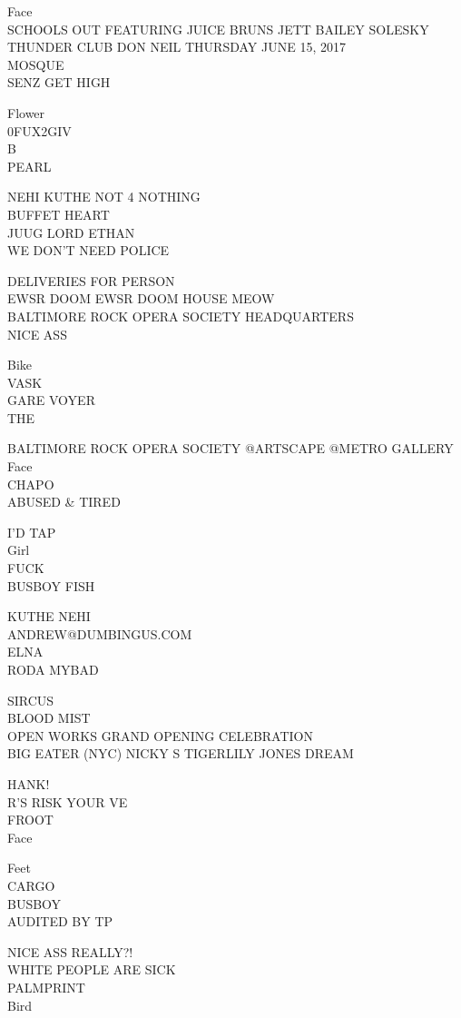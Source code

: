 \documentclass[10pt,letterpaper]{article}
\begin{document}
Face\\
SCHOOLS OUT FEATURING JUICE BRUNS JETT BAILEY SOLESKY THUNDER CLUB DON NEIL THURSDAY JUNE 15, 2017\\
MOSQUE\\
SENZ GET HIGH

Flower\\
0FUX2GIV\\
B\\
PEARL

NEHI KUTHE NOT 4 NOTHING\\
BUFFET HEART\\
JUUG LORD ETHAN\\
WE DON'T NEED POLICE

DELIVERIES FOR PERSON\\
EWSR DOOM EWSR DOOM HOUSE MEOW\\
BALTIMORE ROCK OPERA SOCIETY HEADQUARTERS\\
NICE ASS

Bike\\
VASK\\
GARE VOYER\\
THE

BALTIMORE ROCK OPERA SOCIETY @ARTSCAPE @METRO GALLERY\\
Face\\
CHAPO\\
ABUSED \& TIRED

I'D TAP\\
Girl\\
FUCK\\
BUSBOY FISH

KUTHE NEHI\\
ANDREW@DUMBINGUS.COM\\
ELNA\\
RODA MYBAD

SIRCUS\\
BLOOD MIST\\
OPEN WORKS GRAND OPENING CELEBRATION\\
BIG EATER (NYC) NICKY S TIGERLILY JONES DREAM

HANK!\\
R'S RISK YOUR VE\\
FROOT\\
Face

Feet\\
CARGO\\
BUSBOY\\
AUDITED BY TP

NICE ASS REALLY?!\\
WHITE PEOPLE ARE SICK\\
PALMPRINT\\
Bird
\end{document}
